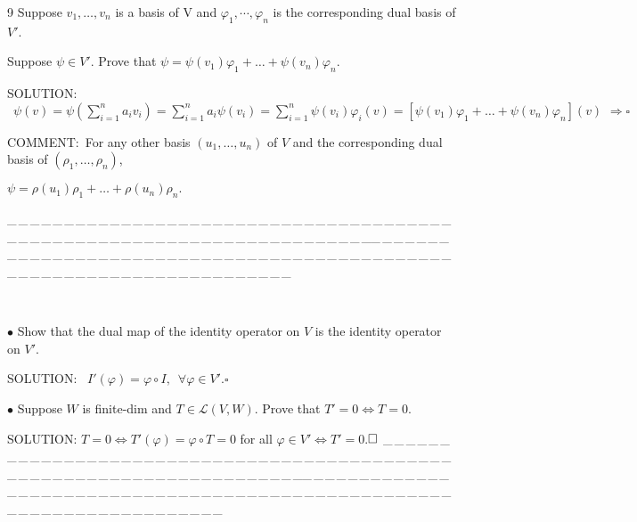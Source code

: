 \documentclass[a4paper, 11pt, UTF8]{article}
\def\Lm{\mathcal{L}}
\begin{document}
\begin{large}
{\timesbf\Large 9} {\timessl\Large
Suppose $v_{1},\dots,v_{n}$ is a basis of V and $\varphi_{1},\cdots,\varphi_{n}$ is the corresponding dual basis of $V'$.}\par\quad
{\timessl \Large
Suppose $\psi \in V'$. Prove that $\psi=\psi(v_1)\varphi_1+\dots+\psi(v_n)\varphi_n.$
}\par
{\timesbf S\footnotesize{OLUTION:}} $\,\,\,\psi(v)=\psi(\sum\limits_{i=1}^n a_i v_i)=\sum\limits_{i=1}^n a_i\psi(v_i)=\sum\limits_{i=1}^n\psi(v_{i})\varphi_i(v)=[\psi(v_1)\varphi_1+\dots+\psi(v_n)\varphi_n](v) \,\,\Rightarrow \square$\par
C{\small OMMENT}:\,\,\,For any other basis $(u_1,\dots,u_n)$ of $V$ and the corresponding dual basis of $(\rho_1,\dots,\rho_n)$,\par\qquad\qquad\quad
$\psi=\rho(u_1)\rho_1+\dots+\rho(u_n)\rho_n.$\par
{\tiny \_\,\_\,\_\,\_\,\_\,\_\,\_\,\_\,\_\,\_\,\_\,\_\,\_\,\_\,\_\,\_\,\_\,\_\,\_\,\_\,\_\,\_\,\_\,\_\,\_\,\_\,\_\,\_\,\_\,\_\,\_\,\_\,\_\,\_\,\_\,\_\,\_\,\_\,\_\,\_\,\_\,\_\,\_\,\_\,\_\,\_\,\_\,\_\,\_\,\_\,\_\,\_\,\_\,\_\,\_\,\_\,\_\,\_\,\_\,\_\,\_\,\_\,\_\,\_\,\_\,\_\,\_\,\_\,\_\,\_\,\_\_\,\_\,\_\,\_\,\_\,\_\,\_\,\_\,\_\,\_\,\_\,\_\,\_\,\_\,\_\,\_\,\_\,\_\,\_\,\_\,\_\,\_\,\_\,\_\,\_\,\_\,\_\,\_\,\_\,\_\,\_\,\_\,\_\,\_\,\_\,\_\,\_\,\_\,\_\,\_\,\_\,\_\,\_\,\_\,\_\,\_\,\_\,\_\,\_\,\_\,\_\,\_\,\_\,\_\,\_\,\_\,\_\,\_\,\_\,\_\,\_\,\_\,\_\,\_\,\_\,\_\,\_\,\_\,\_\,\_\,\_}{\tiny\,\par}

{\small $\bullet$} {\timessl\Large Show that the dual map of the identity operator on $V$ is the identity operator on $V'$.
}\par
{\timesbf S\footnotesize{OLUTION:}} \,\,\,$I'(\varphi)=\varphi\circ I,\,\,\,\forall \varphi \in V'.$\qquad$\square$\par
{\small $\bullet$} {\timessl\Large
Suppose $W$ is finite-dim and $T \in \Lm(V, W)$. Prove that $T'=0 \Longleftrightarrow T=0.$
}\par
{\timesbf S\footnotesize{OLUTION:}} $T=0\Leftrightarrow T'(\varphi)=\varphi\circ T=0$ for all $\varphi\in V'\Leftrightarrow T'=0$.\quad$\square \\ $
{\tiny \_\,\_\,\_\,\_\,\_\,\_\,\_\,\_\,\_\,\_\,\_\,\_\,\_\,\_\,\_\,\_\,\_\,\_\,\_\,\_\,\_\,\_\,\_\,\_\,\_\,\_\,\_\,\_\,\_\,\_\,\_\,\_\,\_\,\_\,\_\,\_\,\_\,\_\,\_\,\_\,\_\,\_\,\_\,\_\,\_\,\_\,\_\,\_\,\_\,\_\,\_\,\_\,\_\,\_\,\_\,\_\,\_\,\_\,\_\,\_\,\_\,\_\,\_\,\_\,\_\,\_\,\_\,\_\,\_\,\_\,\_\_\,\_\,\_\,\_\,\_\,\_\,\_\,\_\,\_\,\_\,\_\,\_\,\_\,\_\,\_\,\_\,\_\,\_\,\_\,\_\,\_\,\_\,\_\,\_\,\_\,\_\,\_\,\_\,\_\,\_\,\_\,\_\,\_\,\_\,\_\,\_\,\_\,\_\,\_\,\_\,\_\,\_\,\_\,\_\,\_\,\_\,\_\,\_\,\_\,\_\,\_\,\_\,\_\,\_\,\_\,\_\,\_\,\_\,\_\,\_\,\_\,\_\,\_\,\_\,\_\,\_\,\_\,\_\,\_\,\_\,\_}\par


\end{large}
\end{document}
